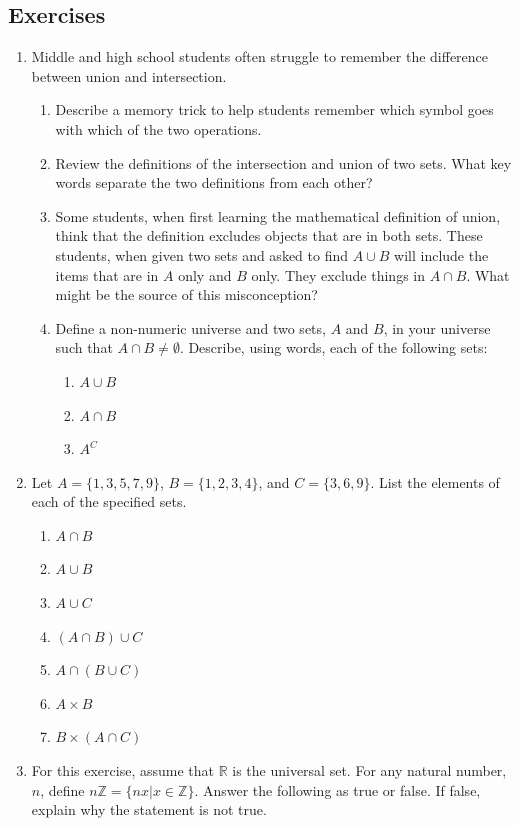 \documentclass[
]{book}
\providecommand{\tightlist}{%
  \setlength{\itemsep}{0pt}\setlength{\parskip}{0pt}}
\theoremstyle{definition}
\theoremstyle{definition}
\theoremstyle{definition}
\theoremstyle{definition}
\theoremstyle{remark}
\begin{document}
\hypertarget{exercises-4}{%
\subsection{Exercises}\label{exercises-4}}

\begin{enumerate}
\def\labelenumi{\arabic{enumi}.}
\item
  Middle and high school students often struggle to remember the difference between union and intersection.

  \begin{enumerate}
  \def\labelenumii{\alph{enumii})}
  \tightlist
  \item
    Describe a memory trick to help students remember which symbol goes with which of the two operations.
  \item
    Review the definitions of the intersection and union of two sets. What key words separate the two definitions from each other?
  \item
    Some students, when first learning the mathematical definition of union, think that the definition excludes objects that are in both sets. These students, when given two sets and asked to find \(A \cup B\) will include the items that are in \(A\) only and \(B\) only. They exclude things in \(A \cap B\). What might be the source of this misconception?
  \item
    Define a non-numeric universe and two sets, \(A\) and \(B\), in your universe such that \(A \cap B \neq \emptyset\). Describe, using words, each of the following sets:

    \begin{enumerate}
    \def\labelenumiii{\roman{enumiii}.}
    \tightlist
    \item
      \(A \cup B\)
    \item
      \(A \cap B\)
    \item
      \(A^{C}\)
    \end{enumerate}
  \end{enumerate}
\item
  Let \(A = \{1, 3, 5, 7, 9\}\), \(B=\{1, 2, 3, 4\}\), and \(C=\{3, 6, 9\}\). List the elements of each of the specified sets.

  \begin{enumerate}
  \def\labelenumii{\alph{enumii}.}
  \tightlist
  \item
    \(A \cap B\)
  \item
    \(A \cup B\)
  \item
    \(A \cup C\)
  \item
    \((A\cap B) \cup C\)
  \item
    \(A \cap (B \cup C)\)
  \item
    \(A \times B\)
  \item
    \(B \times (A\cap C)\)
  \end{enumerate}
\item
  For this exercise, assume that \(\mathbb{R}\) is the universal set. For any natural number, \(n\), define \(n\mathbb{Z} = \{nx \vert x \in \mathbb{Z}\}\). Answer the following as true or false. If false, explain why the statement is not true.


\end{enumerate}
\end{document}
